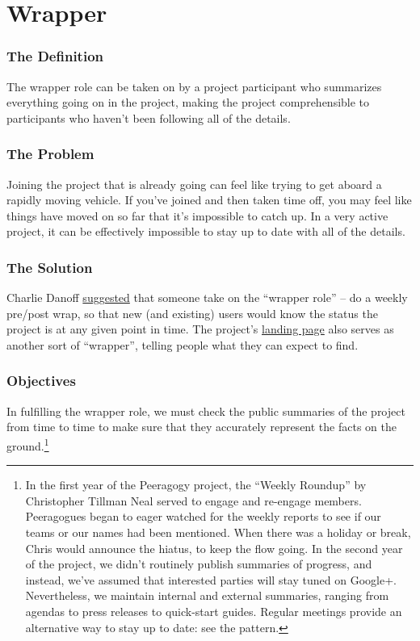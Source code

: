 \section{Wrapper}\label{sec:Wrapper}
\subsubsection*{The Definition} The wrapper role can be taken on by a project
participant who summarizes everything going on in the project, making
the project comprehensible to participants who haven't been following
all of the details.

\subsubsection*{The Problem} Joining the project that is already going can feel
like trying to get aboard a rapidly moving vehicle. If you've joined and
then taken time off, you may feel like things have moved on so far that
it's impossible to catch up. In a very active project, it can be
effectively impossible to stay up to date with all of the details.

\subsubsection*{The Solution} Charlie
Danoff \href{http://socialmediaclassroom.com/host/peeragogy/wiki/rolesdivision-labor}{suggested}
that someone take on the ``wrapper role'' -- do a weekly pre/post wrap,
so that new (and existing) users would know the status the project is at
any given point in time. The
project's \href{http://socialmediaclassroom.com/host/peeragogy/}{landing
page} also serves as another sort of ``wrapper'', telling people what
they can expect to find.

\subsubsection*{Objectives} In fulfilling the wrapper role, we must check the
public summaries of the project from time to time to make sure that they
accurately represent the facts on the ground.\footnote{In the first year of the Peeragogy project, the
``Weekly Roundup'' by Christopher Tillman Neal served to engage and
re-engage members. Peeragogues began to eager watched for the weekly
reports to see if our teams or our names had been mentioned. When there
was a holiday or break, Chris would announce the hiatus, to keep the
flow going. In the second year of the project, we didn't routinely
publish summaries of progress, and instead, we've assumed that
interested parties will stay tuned on Google+. Nevertheless, we maintain
internal and external summaries, ranging from agendas to press releases
to quick-start guides. Regular meetings provide an alternative way to
stay up to date: see
the  pattern.}

